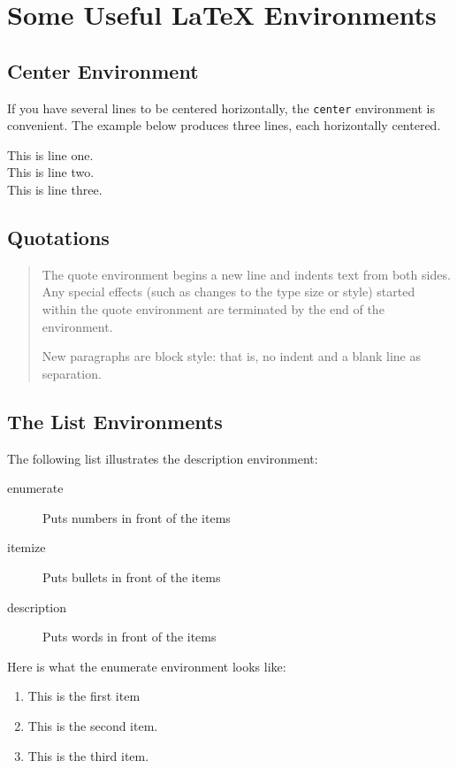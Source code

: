 \documentclass{article}               %
\begin{document}

\section{Some Useful LaTeX Environments}
\subsection{Center Environment}
If you have several lines to be centered horizontally,
the \texttt{center} environment is convenient.  The example below
produces three lines, each horizontally centered.
\begin{center}
  This is line one. \\
  This is line two. \\
  This is line three.
\end{center}

\subsection{Quotations}
\begin{quote}
\small          %
The quote environment begins a new line and indents text from
both sides.
Any special effects (such as changes to the type size or style) 
started within the quote environment are terminated by the end of the environment.

New paragraphs are block style: that is, no indent and a blank line
as separation.
\end{quote}

\subsection{The List Environments}
The following list illustrates the description environment:
\begin{description}
  \item[enumerate] Puts numbers in front of the items
  \item[itemize] Puts bullets in front of the items
  \item[description] Puts words in front of the items
\end{description}

Here is what the enumerate environment looks like:
\begin{enumerate}     
  \item This is the first item
  \item This is the second item.
  \item This is the third item.
\end{enumerate}


\end{document}
